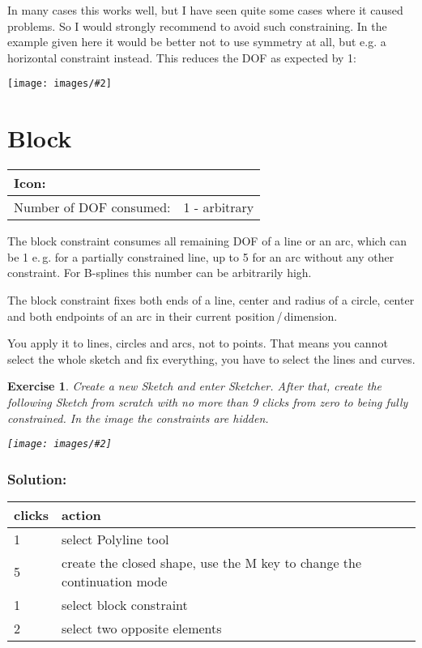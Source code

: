 \documentclass[12pt,titlepage]{article}
\newcommand{\icon}[1]{\raisebox{-1em}{\rule{0pt}{27pt}\texttt{[image: images/\#1]}}}
\newcommand{\img}[2]{\vspace{2ex}\noindent\texttt{[image: images/\#2]}}
\newcommand{\dofConsumed}{Number of DOF consumed:}
\newtheorem{Exercise}{Exercise}
\begin{document}
In many cases this works well, but I have seen quite some cases where it
caused problems. So I would strongly recommend to avoid such constraining. In
the example given here it would be better not to use symmetry at all, but e.g.
a horizontal constraint instead. This reduces the DOF as expected by 1:

\img{width=0.6\textwidth}{SymmetryPatho4}


\section{Block}
\begin{tabular}{|l|l|}
\hline
Icon: & \icon{Sketcher_ConstrainBlock}\\
\hline
\dofConsumed & 1 - arbitrary \\
\hline
\end{tabular}

The block constraint consumes all remaining DOF of a line or an arc, which can
be 1 e.\,g. for a partially constrained line, up to 5 for an arc without any other
constraint. For B-splines this number can be arbitrarily high.

The block constraint fixes both ends of a line, center and radius of a circle,
center and both endpoints of an arc in their current position\,/\,dimension.

You apply it to lines, circles and arcs, not to points. That means you cannot
select the whole sketch and fix everything, you have to select the lines and
curves.

\begin{Exercise}
Create a new Sketch and enter Sketcher. After that, create the following
Sketch from scratch with no more than 9 clicks from zero to being fully
constrained. In the image the constraints are hidden.

\img{}{BlockHidden}
\end{Exercise}

\subsubsection*{Solution:} 

\begin{tabular}{|l|l|}
\hline
{\bf clicks} & {\bf action}\\
\hline
1  & select Polyline tool\\
5  & create the closed shape, use the M key to change the continuation mode\\
1  & select block constraint\\
2  & select two opposite elements\\
\hline
\end{tabular}
\end{document}
